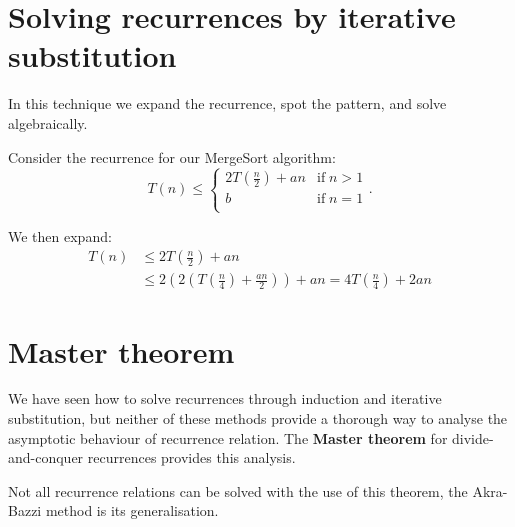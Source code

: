 \section{Solving recurrences by iterative substitution}

In this technique we expand the recurrence, spot the pattern, and solve algebraically. 

\begin{example}
    Consider the recurrence for our MergeSort algorithm:
    \[
        T(n)\leq
        \begin{cases}
            2T(\frac n2)+an&\text{if}\;n>1\\
            b&\text{if}\;n=1\\
        \end{cases}
        .
    \]
    
    We then expand:
    \begin{align*}
        T(n)&\leq2T\left(\frac n2\right)+an\\
        &\leq2\left(2\left(T\left(\frac n4\right)+\frac{an}2\right)\right)+an=4T\left(\frac n4\right)+2an
    \end{align*}
\end{example}

\section{Master theorem}

We have seen how to solve recurrences through induction and iterative substitution, but neither of these methods provide a thorough way to analyse the asymptotic behaviour of recurrence relation. The \textbf{Master theorem} for divide-and-conquer recurrences provides this analysis.

\begin{remark}
    Not all recurrence relations can be solved with the use of this theorem, the Akra-Bazzi method is its generalisation.
\end{remark}

